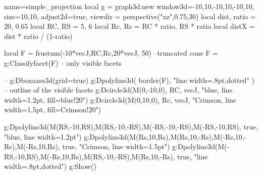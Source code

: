 \documentclass{standalone}
\begin{document}
\begin{luadraw}{name=simple_projection}
    local g = graph3d:new{
        window3d={-10,10,-10,10,-10,10}, 
        size={10,10}, adjust2d=true,
        viewdir = perspective("xz",0.75,30)
    }
    local dist, ratio = 20, 0.65
    local RC, RS = 5, 6
    local Rc, Rs = RC * ratio, RS * ratio
    local distX = dist * ratio / (1-ratio)
    
    local F = frustum(-10*vecJ,RC,Rc,20*vecJ, 50) --truncated cone
    F = g:Classifyfacet(F) -- only visible facets

    -- g:Dboxaxes3d({grid=true})
    g:Dpolyline3d( border(F), "line width=.8pt,dotted" ) -- outline of the visible facets
    g:Dcircle3d(M(0,-10,0), RC, vecJ, "blue, line width=1.2pt, fill=blue!20")
    g:Dcircle3d(M(0,10,0), Rc, vecJ, "Crimson, line width=1.5pt, fill=Crimson!20")
    
    g:Dpolyline3d({M(RS,-10,RS),M(RS,-10,-RS),M(-RS,-10,-RS),M(-RS,-10,RS)}, true, "blue, line width=1.2pt")
    g:Dpolyline3d({M(Rs,10,Rs),M(Rs,10,-Rs),M(-Rs,10,-Rs),M(-Rs,10,Rs)}, true, "Crimson, line width=1.5pt")
    g:Dpolyline3d({{M(-RS,-10,RS),M(-Rs,10,Rs)},{M(RS,-10,-RS),M(Rs,10,-Rs)}}, true, "line width=.8pt,dotted")
    g:Show()
\end{luadraw}
\end{document}
